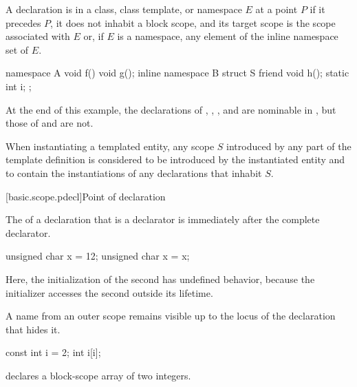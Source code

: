 \pnum
{}%
A declaration is 
in a class, class template, or namespace $E$ at a point $P$ if
it precedes $P$,
it does not inhabit a block scope, and
its target scope is the scope associated with $E$ or,
if $E$ is a namespace,
any element of the inline namespace set of $E$.
\begin{example}
\begin{codeblock}
namespace A {
  void f() {void g();}
  inline namespace B {
    struct S {
      friend void h();
      static int i;
    };
  }
}
\end{codeblock}
At the end of this example,
the declarations of , , , and 
are nominable in , but those of  and  are not.
\end{example}

\pnum
When instantiating a templated entity,
any scope $S$ introduced by any part of the template definition is considered
to be introduced by the instantiated entity and
to contain the instantiations of any declarations that inhabit $S$.

[basic.scope.pdecl]{Point of declaration}

%
%
%

\pnum
{}%
The  of a declaration that is a declarator
is immediately after the complete declarator.
\begin{example}
\begin{codeblock}
unsigned char x = 12;
{ unsigned char x = x; }
\end{codeblock}
Here, the initialization of the second  has undefined behavior,
because the initializer accesses the second 
outside its lifetime.
\end{example}

\pnum
\begin{note}
%
A name from an outer scope remains visible up to
the locus of the declaration that hides it.
\begin{example}
\begin{codeblock}
const int i = 2;
{ int i[i]; }
\end{codeblock}
declares a block-scope array of two integers.
\end{example}
\end{note}

